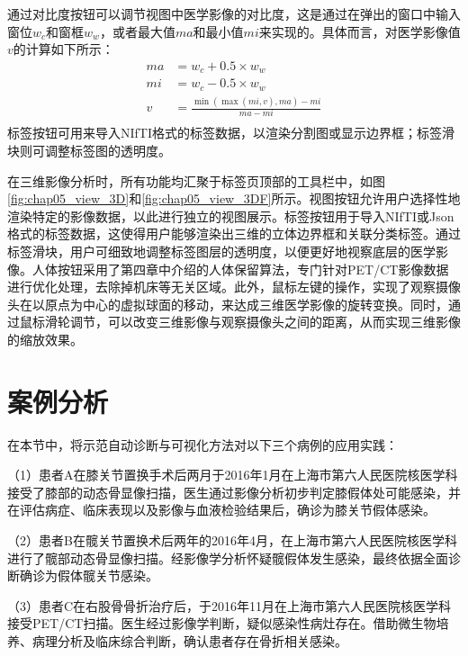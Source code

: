 通过对比度按钮可以调节视图中医学影像的对比度，这是通过在弹出的窗口中输入窗位\(w_c\)和窗框\(w_w\)，或者最大值\(ma\)和最小值\(mi\)来实现的。具体而言，对医学影像值\(v\)的计算如下所示：
\begin{equation}
    \begin{aligned}
        ma & = w_c + 0.5 \times w_w                       \\
        mi & = w_c - 0.5 \times w_w                       \\
        v  & = \frac{\min(\max(mi, v), ma) - mi}{ma - mi} \\
    \end{aligned}
    \label{eq:chap05_constrast}
\end{equation}
标签按钮可用来导入NIfTI格式的标签数据，以渲染分割图或显示边界框；标签滑块则可调整标签图的透明度。

在三维影像分析时，所有功能均汇聚于标签页顶部的工具栏中，如图\ref{fig:chap05_view_3D}和\ref{fig:chap05_view_3DF}所示。视图按钮允许用户选择性地渲染特定的影像数据，以此进行独立的视图展示。标签按钮用于导入NIfTI或Json格式的标签数据，这使得用户能够渲染出三维的立体边界框和关联分类标签。通过标签滑块，用户可细致地调整标签图层的透明度，以便更好地视察底层的医学影像。人体按钮采用了第四章中介绍的人体保留算法，专门针对PET/CT影像数据进行优化处理，去除掉机床等无关区域。此外，鼠标左键的操作，实现了观察摄像头在以原点为中心的虚拟球面的移动，来达成三维医学影像的旋转变换。同时，通过鼠标滑轮调节，可以改变三维影像与观察摄像头之间的距离，从而实现三维影像的缩放效果。

\section{案例分析}

在本节中，将示范自动诊断与可视化方法对以下三个病例的应用实践：

（1）患者A在膝关节置换手术后两月于2016年1月在上海市第六人民医院核医学科接受了膝部的动态骨显像扫描，医生通过影像分析初步判定膝假体处可能感染，并在评估病症、临床表现以及影像与血液检验结果后，确诊为膝关节假体感染。

（2）患者B在髋关节置换术后两年的2016年4月，在上海市第六人民医院核医学科进行了髋部动态骨显像扫描。经影像学分析怀疑髋假体发生感染，最终依据全面诊断确诊为假体髋关节感染。

（3）患者C在右股骨骨折治疗后，于2016年11月在上海市第六人民医院核医学科接受PET/CT扫描。医生经过影像学判断，疑似感染性病灶存在。借助微生物培养、病理分析及临床综合判断，确认患者存在骨折相关感染。

